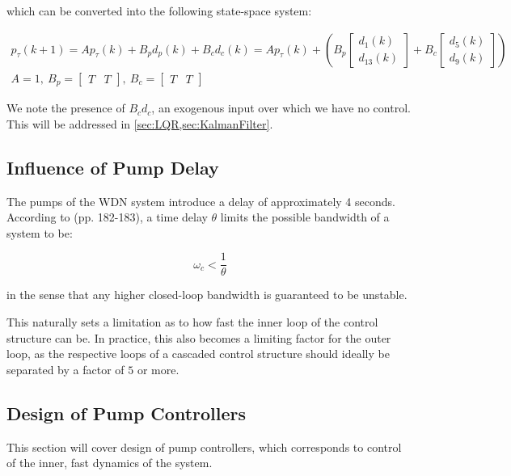 which can be converted into the following state-space system:

\begin{equation}\label{eq:TankPressureStateSpace}
	\begin{gathered}
				p_\tau(k+1) = A p_\tau(k) + B_pd_p(k) + B_cd_c(k)
				= A p_\tau(k) + \left(B_p \begin{bmatrix}d_1(k) \\ d_{13}(k)\end{bmatrix} 
				+ B_c\begin{bmatrix}d_5(k) \\ d_9(k)\end{bmatrix}\right) \\      
				A = 1, \ B_p = \begin{bmatrix}T & T \end{bmatrix}, \ B_c = \begin{bmatrix}T & T\end{bmatrix}
	\end{gathered}
\end{equation}

We note the presence of $B_cd_c$, an exogenous input over which we have no control. This will be addressed in \cref{sec:LQR,sec:KalmanFilter}.

\subsection{Influence of Pump Delay}
The pumps of the WDN system introduce a delay of approximately 4 seconds. According to \cite{Skogestad2005} (pp. 182-183), 
a time delay $\theta$ limits the possible bandwidth of a system to be:

\begin{equation}\label{eq:BWdelay}
	\omega_c < \frac{1}{\theta}
\end{equation}

in the sense that any higher closed-loop bandwidth is guaranteed to be unstable.

This naturally sets a limitation as to how fast the inner loop of the control structure can be. In practice, this also becomes a limiting factor for the outer loop, as the respective loops of a cascaded control structure should ideally be separated by a factor of $5$ or more.

\subsection{Design of Pump Controllers}
This section will cover design of pump controllers, which corresponds to control of the inner, fast dynamics of the system.

